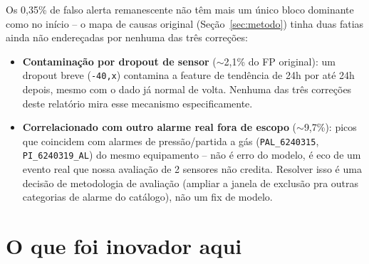 \documentclass[11pt,a4paper]{article}
\begin{document}
Os 0,35\% de falso alerta remanescente não têm mais um único bloco
dominante como no início -- o mapa de causas original (Seção~\ref{sec:metodo})
tinha duas fatias ainda não endereçadas por nenhuma das três correções:

\begin{itemize}
  \item \textbf{Contaminação por dropout de sensor} ($\sim$2,1\% do FP
        original): um dropout breve (\texttt{-40,x}) contamina a feature
        de tendência de 24h por até 24h depois, mesmo com o dado já
        normal de volta. Nenhuma das três correções deste relatório
        mira esse mecanismo especificamente.
  \item \textbf{Correlacionado com outro alarme real fora de escopo}
        ($\sim$9,7\%): picos que coincidem com alarmes de pressão/partida
        a gás (\texttt{PAL\_6240315}, \texttt{PI\_6240319\_AL}) do mesmo
        equipamento -- não é erro do modelo, é eco de um evento real que
        nossa avaliação de 2 sensores não credita. Resolver isso é uma
        decisão de metodologia de avaliação (ampliar a janela de exclusão
        pra outras categorias de alarme do catálogo), não um fix de
        modelo.
\end{itemize}

\section{O que foi inovador aqui}
\end{document}
